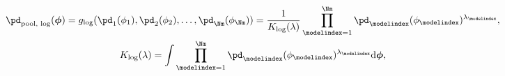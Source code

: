 \begin{equation}
\begin{gathered}
  \pd_{\text{pool, log}}(\boldsymbol{\phi}) =
  g_{\text{log}}(\pd_{1}(\phi_{1}), \pd_{2}(\phi_{2}), \ldots, \pd_{\Nm}(\phi_{\Nm})) =
  \frac{1}{K_{\text{log}}(\lambda)}
  \prod_{\modelindex = 1}^{\Nm}
    \pd_{\modelindex}(\phi_{\modelindex})^{\lambda_{\modelindex}}, \\
  K_{\text{log}}(\lambda) = 
  \int
    \prod_{\modelindex = 1}^{\Nm}
    \pd_{\modelindex}(\phi_{\modelindex})^{\lambda_{\modelindex}}
  \text{d}\boldsymbol{\phi},
  \label{eqn:pooled-prior-overall}
\end{gathered}
\end{equation}